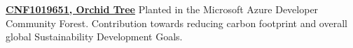 \href{https://drive.google.com/file/d/1FKoI-S8cdUE1Gvdxb3YfpR3sbBSkO3Xz/view?usp=sharing}{\textbf{CNF1019651, Orchid Tree}} Planted in the Microsoft Azure Developer Community Forest. Contribution towards reducing carbon footprint and overall global Sustainability Development Goals. \par